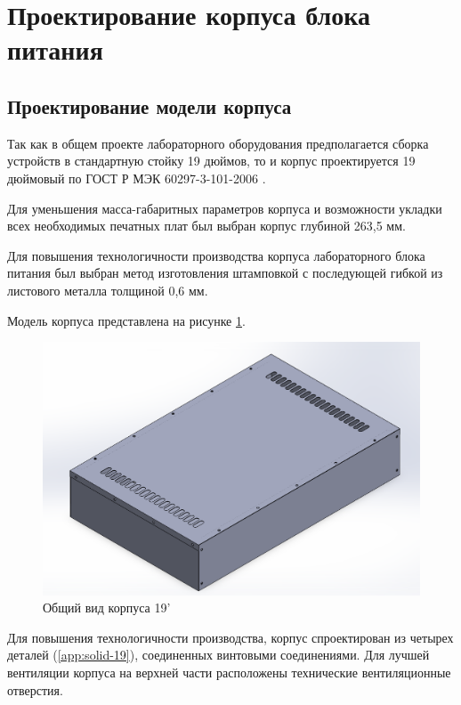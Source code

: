 \documentclass[utf8x, 14pt, oneside, a4paper]{article}
\begin{document}
	
	\section{Проектирование корпуса блока питания}
	
		\subsection{Проектирование модели корпуса}
		
		Так как в общем проекте лабораторного оборудования предполагается сборка устройств в стандартную стойку 19 дюймов, то и корпус проектируется 19 дюймовый по ГОСТ Р МЭК 60297-3-101-2006 \cite{bib:gost_60297}.
		
		Для уменьшения масса-габаритных параметров корпуса и возможности укладки всех необходимых печатных плат был выбран корпус глубиной 263,5 мм.
		
		Для повышения технологичности производства корпуса лабораторного блока питания был выбран метод изготовления штамповкой с последующей гибкой из листового металла толщиной 0,6 мм.
		
		Модель корпуса представлена на рисунке \ref{fig:solid-19-view}.
		
		\begin{figure}[H]
			\centering
			\includegraphics[width=0.9\linewidth]{"Рисунки/Solid-19-view"}
			\caption{Общий вид корпуса 19'}
			\label{fig:solid-19-view}
		\end{figure}
	
		Для повышения технологичности производства, корпус спроектирован из четырех деталей (\ref{app:solid-19}), соединенных винтовыми соединениями. Для лучшей вентиляции корпуса на верхней части расположены технические вентиляционные отверстия.
		
\end{document}
